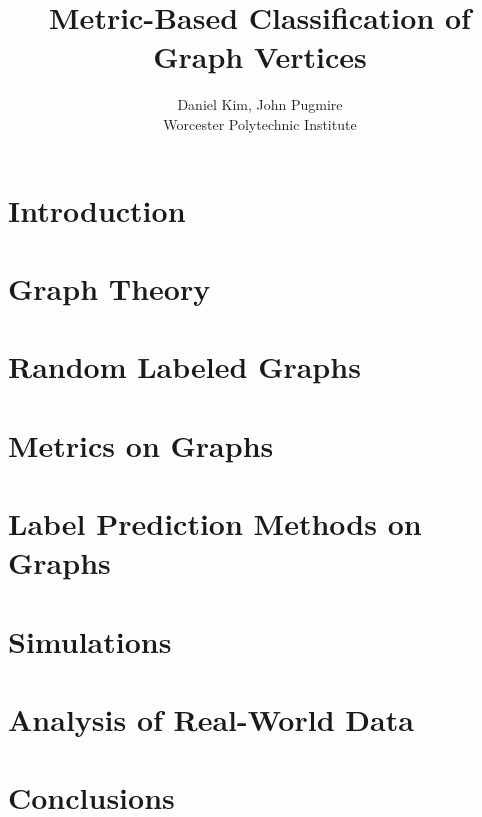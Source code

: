\documentclass[11pt,oneside]{report}
\theoremstyle{definition}
\begin{document}
\title{Metric-Based Classification of Graph Vertices}
\author{Daniel Kim, John Pugmire\\Worcester Polytechnic Institute\\}
\maketitle
\tableofcontents


\chapter{Introduction}



\chapter{Graph Theory}



\chapter{Random Labeled Graphs}



\chapter{Metrics on Graphs}



\chapter{Label Prediction Methods on Graphs}



\chapter{Simulations}



\chapter{Analysis of Real-World Data}



\chapter{Conclusions}





\end{document}
